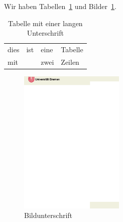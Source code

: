 Wir haben Tabellen~\ref{tab:example} und Bilder~\ref{fig:example}.

\begin{table}
 \centering
 \begin{tabular}{llll}
  \toprule
  dies & ist & eine & Tabelle \\
  mit  &     & zwei & Zeilen \\
  \bottomrule
 \end{tabular}
 \caption[Tabelle mit kurzer Unterschrift]{Tabelle mit einer langen Unterschrift}
 \label{tab:example}
\end{table}



\begin{figure}
 \includegraphics[width=5cm]{logos/titlepage.eps}
 \caption[Bild kurz]{Bildunterschrift}
 \label{fig:example}
\end{figure}
